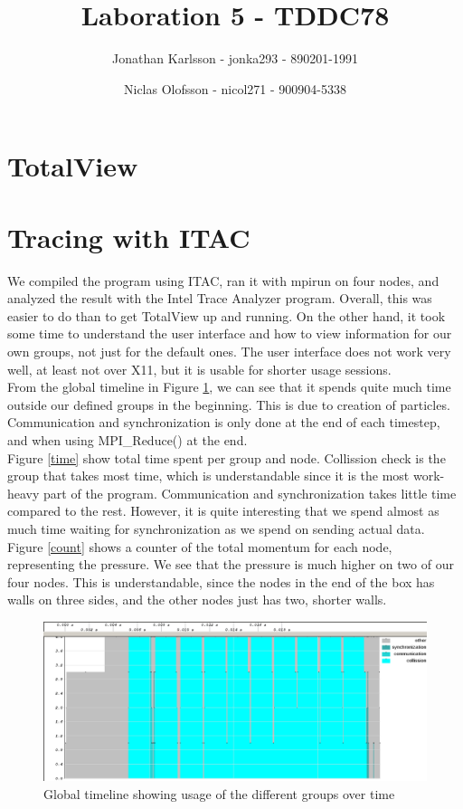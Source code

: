 \documentclass[a4paper]{article}
\author{Jonathan Karlsson - jonka293 - 890201-1991 \and Niclas Olofsson - nicol271 - 900904-5338}
\title{Laboration 5 - TDDC78}
\begin{document}
\maketitle

\section{TotalView}


\section{Tracing with ITAC}

We compiled the program using ITAC, ran it with mpirun on four nodes,
and analyzed the result with the Intel Trace Analyzer program. Overall,
this was easier to do than to get TotalView up and running. On the other
hand, it took some time to understand the user interface and how to view
information for our own groups, not just for the default ones. The user
interface does not work very well, at least not over X11, but it is
usable for shorter usage sessions.\\

From the global timeline in Figure \ref{timeline}, we can see that it
spends quite much time outside our defined groups in the beginning. This
is due to creation of particles. Communication and synchronization is
only done at the end of each timestep, and when using MPI\_Reduce() at
the end.\\

Figure \ref{time} show total time spent per group and node. Collission
check is the group that takes most time, which is understandable since
it is the most work-heavy part of the program. Communication and
synchronization takes little time compared to the rest. However, it is
quite interesting that we spend almost as much time waiting for
synchronization as we spend on sending actual data.\\

Figure \ref{count} shows a counter of the total momentum for each node,
representing the pressure. We see that the pressure is much higher on
two of our four nodes. This is understandable, since the nodes in the
end of the box has walls on three sides, and the other nodes just has
two, shorter walls.\\

\begin{figure}[H]
  \centering
  \includegraphics[scale=0.3]{global_timeline.png}
  \caption{Global timeline showing usage of the different groups over time}
  \label{timeline}
\end{figure}
\end{document}
